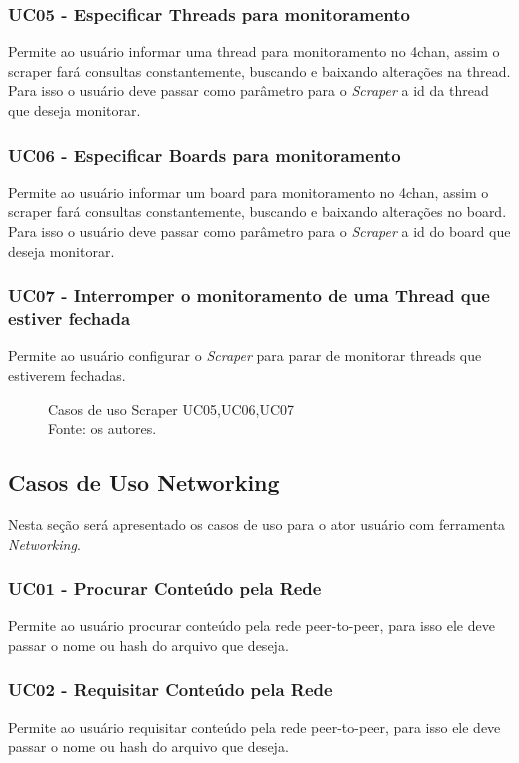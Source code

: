 \subsubsection{UC05 - Especificar Threads para monitoramento}
Permite ao usuário informar uma thread para monitoramento no 4chan, assim o scraper fará consultas constantemente, buscando e baixando alterações na thread. Para isso o usuário deve passar como parâmetro para o \textit{Scraper} a id da thread que deseja monitorar.  
\subsubsection{UC06 - Especificar Boards para monitoramento}
Permite ao usuário informar um board para monitoramento no 4chan, assim o scraper fará consultas constantemente, buscando e baixando alterações no board. Para isso o usuário deve passar como parâmetro para o \textit{Scraper} a id do board que deseja monitorar.  
\subsubsection{UC07 - Interromper o monitoramento de uma Thread que estiver fechada}
Permite ao usuário configurar o \textit{Scraper} para parar de monitorar threads que estiverem fechadas.
\begin{figure}[H]
    \centering
    
    \caption[Casos de uso Scraper UC05,UC06,UC07]{\label{fig:Ator_Scraper2}
        Casos de uso Scraper UC05,UC06,UC07\\
        Fonte: os autores.
    }
\end{figure}
\subsection{Casos de Uso Networking}
Nesta seção será apresentado os casos de uso para o ator usuário com ferramenta \textit{Networking}.
\subsubsection{UC01 - Procurar Conteúdo pela Rede}
Permite ao usuário procurar conteúdo pela rede peer-to-peer, para isso ele deve passar o nome ou hash do arquivo que deseja.
\subsubsection{UC02 - Requisitar Conteúdo pela Rede}
Permite ao usuário requisitar conteúdo pela rede peer-to-peer, para isso ele deve passar o nome ou hash do arquivo que deseja.
